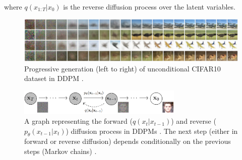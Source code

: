 where $q(x_{1:T} | x_0)$ is the reverse diffusion process over the latent variables.


\begin{figure}
    \centering
    \includegraphics[width=1\textwidth]{images/diffusion_models/ddpm_denoise.png}
    \caption{Progressive generation (left to right) of unconditional CIFAR10 dataset in DDPM \cite{ddpm}.}
\end{figure}


\begin{figure}
    \centering
    \includegraphics[width=0.7\textwidth]{images/diffusion_models/ddpm_process.png}
    \caption{A graph representing the forward ($q(x_t | x_{t-1})$) and reverse ($p_\theta(x_{t-1} | x_t)$) diffusion process in DDPMs \cite{ddpm}. The next step (either in forward or reverse diffusion) depends conditionally on the previous steps (Markov chains) \cite{ddpm}.}
    \label{fig:ddpm_process}
\end{figure}






